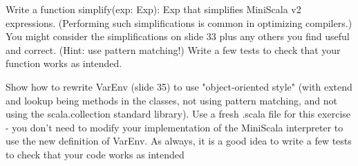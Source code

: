 \documentclass[working, oneside]{../../../../Preambles/tuftebook}
\begin{document}
\newpage
\begin{exercise}[2]
Write a function simplify(exp: Exp): Exp that simplifies MiniScala v2 expressions. (Performing such simplifications is common in optimizing compilers.) You might consider the simplifications on slide 33 plus any others you find useful and correct. (Hint: use pattern matching!) Write a few tests to check that your function works as intended.
\end{exercise}
\begin{solution}

\end{solution}
\begin{exercise}[3]
Show how to rewrite VarEnv (slide 35) to use "object-oriented style" (with extend and lookup being methods in the classes, not using pattern matching, and not using the scala.collection standard library). Use a fresh .scala file for this exercise - you don't need to modify your implementation of the MiniScala interpreter to use the new definition of VarEnv. As always, it is a good idea to write a few tests to check that your code works as intended
\end{exercise}
\begin{solution}

\end{solution}
\end{document}
